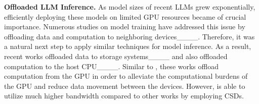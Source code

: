 \textbf{Offloaded LLM Inference.}
As model sizes of recent LLMs grew exponentially, efficiently deploying these models on limited GPU resources became of crucial importance.
Numerous studies on model training have addressed this issue by offloading data and computation to neighboring devices____.
Therefore, it was a natural next step to apply similar techniques for model inference.
As a result, recent works offloaded data to storage systems____ and also offloaded computation to the host CPU____.
Similar to \thiswork, these works offload computation from the GPU in order to alleviate the computational burdens of the GPU and reduce data movement between the devices.
However, \thiswork is able to utilize much higher bandwidth compared to other works by employing CSDs.


